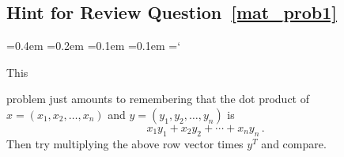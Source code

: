 
\subsection*{Hint for Review Question~\ref{mat_prob1}}

{\ttfamily
{}\font=0.4em
\font=0.2em
\font=0.1em
\font=0.1em
\hyphenchar\font=`\-


\hypertarget{scripts_matrices_hint1}{This } problem just amounts to remembering that the dot product of
$x=(x_1,x_2,\ldots,x_n)$ and $y=(y_1,y_2,\ldots,y_n)$ is 
$$
x_1y_1+ x_2y_2+\cdots + x_n y_n\, .
$$ 
Then try multiplying the above row vector times $y^T$ and compare.

} %

